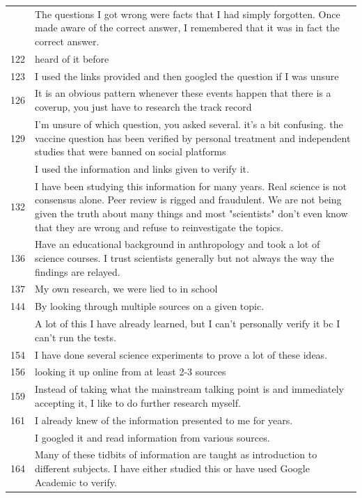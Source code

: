 \documentclass[
  doc,floatsintext]{apa6}
\begin{document}
\begin{longtable}[t]{>{}r>{\raggedright\arraybackslash}p{30em}}
\addlinespace
120 & The questions I got wrong were facts that I had simply forgotten. Once made aware of the correct answer, I remembered that it was in fact the correct answer.\\
122 & heard of it before\\
123 & I used the links provided and then googled the question if I was unsure\\
126 & It is an obvious pattern whenever these events happen that there is a coverup, you just have to research the track record\\
129 & I'm unsure of which question, you asked several.  it's a bit confusing. the vaccine question has been verified by personal treatment and independent studies that were banned on social platforms\\
\addlinespace
131 & I used the information and links given to verify it.\\
132 & I have been studying this information for many years. Real science is not consensus alone. Peer review is rigged and fraudulent. We are not being given the truth about many things and most "scientists" don't even know that they are wrong and refuse to reinvestigate the topics.\\
136 & Have an educational background in anthropology and took a lot of science courses. I trust scientists generally but not always the way the findings are relayed.\\
137 & My own research, we were lied to in school\\
144 & By looking through multiple sources on a given topic.\\
\addlinespace
152 & A lot of this I have already learned, but I can't personally verify it bc I can't run the tests.\\
154 & I have done several science experiments to prove a lot of these ideas.\\
156 & looking it up online from at least 2-3 sources\\
159 & Instead of taking what the mainstream talking point is and immediately accepting it, I like to do further research myself.\\
161 & I already knew of the information presented to me for years.\\
\addlinespace
163 & I googled it and read information from various sources.\\
164 & Many of these tidbits of information are taught as introduction to different subjects. I have either studied this or have used Google  Academic to verify.\\

\end{longtable}
\end{document}
